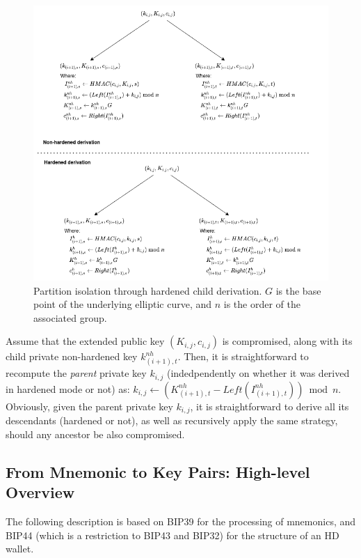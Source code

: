 \begin{figure}[ht!]
  \includegraphics[width=\textwidth]{figures/child_derivation.png}
  \caption{Partition isolation through hardened child derivation. $G$ is the
    base point of the underlying elliptic curve, and $n$ is the order of
    the associated group.}
  \label{fig:isolation}
\end{figure}

Assume that the extended public key $(K_{i,j}, c_{i,j})$ is compromised, along
with its child private non-hardened key $k^{nh}_{(i+1),t}$. Then, it is
straightforward  to recompute the \emph{parent} private key $k_{i,j}$
(indedpendently on whether it was derived in hardened mode or not) as:
$k_{i,j} \leftarrow (K_{(i+1),t}^{nh} - Left(I_{(i+1),t}^{nh})) \bmod n$.
Obviously, given the parent private key $k_{i,j}$, it is straightforward to
derive all its descendants (hardened or not), as well as recursively apply the
same strategy, should any ancestor be also compromised.

\subsection{From Mnemonic to Key Pairs: High-level Overview}

The following description is based on BIP39 for the processing of mnemonics,
and BIP44 (which is a restriction to BIP43 and BIP32) for the structure of
an HD wallet.

